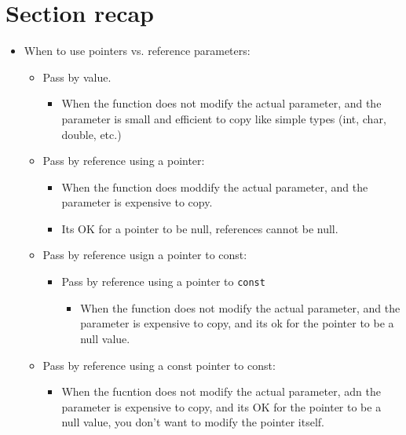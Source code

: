 \section{Section recap}
\begin{itemize}
    \item When to use pointers vs. reference parameters:
        \begin{itemize}
            \item Pass by value.
                \begin{itemize}
                    \item When the function does not modify the actual parameter, and the parameter is small and efficient to copy like simple types (int, char, double, etc.)
                \end{itemize}
            
            \item Pass by reference using a pointer:
                \begin{itemize}
                    \item When the function does moddify the actual parameter, and the parameter is expensive to copy.
                    \item Its OK for a pointer to be null, references cannot be null.
                \end{itemize}
            
            \item Pass by reference usign a pointer to const:
                \begin{itemize}
                    \item Pass by reference using a pointer to \texttt{const}
                        \begin{itemize}
                            \item When the function does not modify the actual parameter, and the parameter is expensive to copy, and its ok for the pointer to be a null value.
                        \end{itemize}
                \end{itemize}
            
            \item Pass by reference using a const pointer to const:
                \begin{itemize}
                    \item When the fucntion does not modify the actual parameter, adn the parameter is expensive to copy, and its OK for the pointer to be a null value, you don't want to modify the pointer itself.
                \end{itemize}
            

\end{itemize}
\end{itemize}

